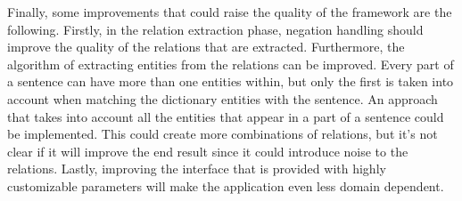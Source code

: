 \documentclass[]{article}
\begin{document}
Finally, some improvements that could raise the quality of the framework are the following. Firstly, in the relation extraction phase, negation handling  should improve the quality of the relations that are extracted. Furthermore, the algorithm of extracting entities from the relations can be improved. Every part of a sentence can have more than one entities within, but only the first is taken into account when matching the dictionary entities with the sentence. An approach that takes into account all the entities that appear in a part of a sentence could be implemented. This could create more combinations of relations, but it's not clear if it will improve the end result since it could introduce noise to the relations. Lastly, improving the interface that is provided with highly customizable parameters will make the application even less domain dependent.
%
\end{document}
